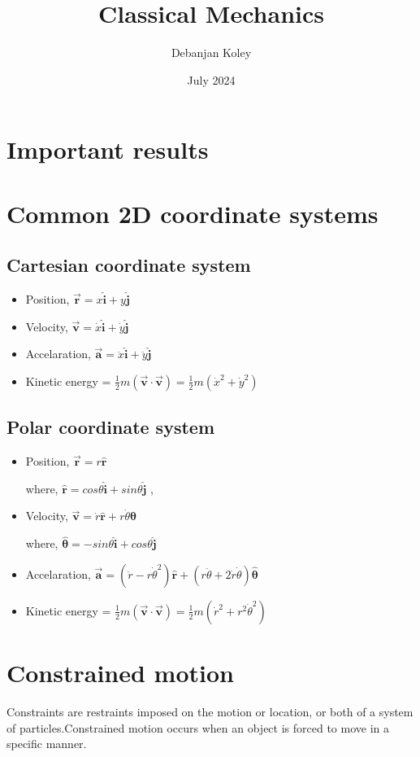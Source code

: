 \documentclass{article}
\title{Classical Mechanics}
\author{Debanjan Koley}
\date{July 2024}
\newcommand{\uvec}[1]{\bm{\hat{#1}}}
\begin{document}
\maketitle
\section*{Important results}
\section{Common 2D coordinate systems}

\subsection{Cartesian coordinate system}
\begin{itemize}
    \item Position, $\bm{\vec{r}} = x\uvec{i} + y\uvec{j}$
    \item Velocity, $\bm{\vec{v}} = \dot{x}\uvec{i} + \dot{y}\uvec{j}$
    \item Accelaration, $\bm{\vec{a}} = \ddot{x}\uvec{i} + \ddot{y}\uvec{j}$
    \item Kinetic energy = $\frac{1}{2}m(\bm{\vec{v}\cdot\vec{v}}) = \frac{1}{2}m(\dot{x}^2 + \dot{y}^2)$
\end{itemize}

\subsection{Polar coordinate system}
\begin{itemize}
    \item Position, $\bm{\vec{r}} = r\uvec{r}$
    
    where, $\uvec{r} = cos\theta\uvec{i} + sin\theta\uvec{j}$ ,
    \item Velocity, $\bm{\vec{v}} = \dot{r}\uvec{r} + r\dot{\theta}\uvec{\theta}$
    
    where, $\uvec{\theta} = -sin\theta\uvec{i} + cos\theta\uvec{j}$
    \item Accelaration, $\bm{\vec{a}} = (\ddot{r} - r\dot{\theta}^2)\uvec{r} + (r\ddot{\theta} + 2\dot{r}\dot{\theta})\uvec{\theta}$
    \item Kinetic energy = $\frac{1}{2}m(\bm{\vec{v}\cdot\vec{v}}) = \frac{1}{2}m(\dot{r}^2 + r^2\dot{\theta}^2)$
\end{itemize}

\newpage
\section*{Constrained motion}
Constraints are restraints imposed on the motion or location, 
or both of a system of particles.Constrained motion occurs when 
an object is forced to move in a specific manner.
\end{document}
